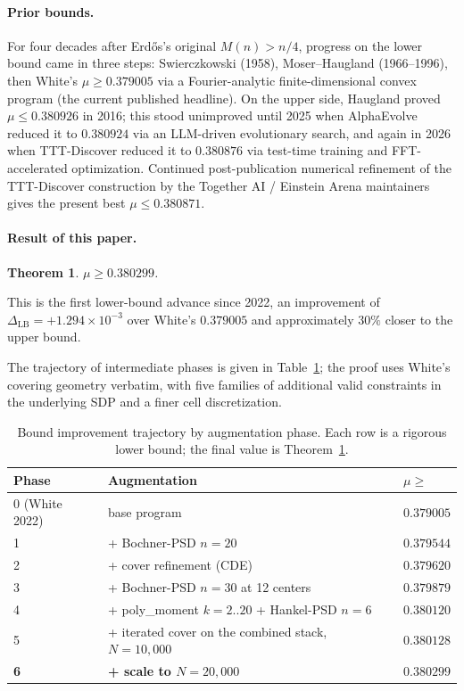 \documentclass[11pt]{article}
\theoremstyle{plain}
\newtheorem{theorem}{Theorem}
\theoremstyle{definition}
\begin{document}
\paragraph{Prior bounds.}
For four decades after Erd\H{o}s's original $M(n) > n/4$, progress on
the lower bound came in three steps: Swierczkowski (1958),
Moser--Haugland (1966--1996), then White's $\mu \ge 0.379005$
\cite{White2023} via a Fourier-analytic finite-dimensional convex
program (the current published headline). On the upper side, Haugland
\cite{Haugland2016} proved $\mu \le 0.380926$ in 2016; this stood
unimproved until 2025 when AlphaEvolve \cite{AlphaEvolve2025} reduced
it to $0.380924$ via an LLM-driven evolutionary search, and again in
2026 when TTT-Discover \cite{TTTDiscover2026} reduced it to $0.380876$
via test-time training and FFT-accelerated optimization. Continued
post-publication numerical refinement of the TTT-Discover construction
by the Together AI / Einstein Arena maintainers \cite{TogetherComputer2026}
gives the present best $\mu \le 0.380871$.

\paragraph{Result of this paper.}
\begin{theorem}\label{thm:main}
$\mu \ge 0.380299$.
\end{theorem}

This is the first lower-bound advance since 2022, an improvement of
$\Delta_{\text{LB}} = +1.294 \times 10^{-3}$ over White's $0.379005$
and approximately $30\%$ closer to the upper bound.

The trajectory of intermediate phases is given in
Table~\ref{tab:trajectory}; the proof uses White's covering geometry
verbatim, with five families of additional valid constraints in the
underlying SDP and a finer cell discretization.

\begin{table}[h]
\centering
\begin{tabular}{lll}
\toprule
Phase & Augmentation & $\mu \ge$ \\
\midrule
0 (White 2022) & base program & $0.379005$ \\
1 & + Bochner-PSD $n=20$ & $0.379544$ \\
2 & + cover refinement (CDE) & $0.379620$ \\
3 & + Bochner-PSD $n=30$ at 12 centers & $0.379879$ \\
4 & + poly\_moment $k=2..20$ + Hankel-PSD $n=6$ & $0.380120$ \\
5 & + iterated cover on the combined stack, $N=10{,}000$ & $0.380128$ \\
\textbf{6} & \textbf{+ scale to $N=20{,}000$} & $\mathbf{0.380299}$ \\
\bottomrule
\end{tabular}
\caption{Bound improvement trajectory by augmentation phase. Each row
is a rigorous lower bound; the final value is Theorem~\ref{thm:main}.}
\label{tab:trajectory}
\end{table}
\end{document}

